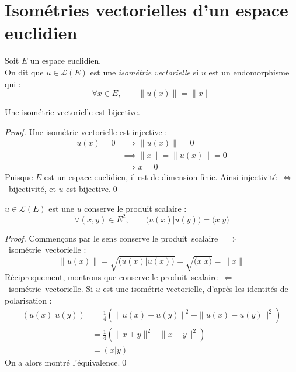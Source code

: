 \documentclass[11pt,a4paper,fleqn,pdftex]{report}
\begin{document}
\section{Isométries vectorielles d'un espace euclidien} %
\label{sec:isometries_vectorielles_d_un_espace_euclidien}
\begin{dfn}
     Soit $E$ un espace euclidien.\\
     On dit que $u\in \mathcal{L}(E)$ est une \emph{isométrie vectorielle} si $u$ est un endomorphisme qui  :
     \begin{equation}
     \forall x\in E,\qquad \|u(x)\| = \| x\|
     \end{equation}
\end{dfn}
\begin{theorem}[Bijectivité]
     Une isométrie vectorielle est bijective.
\end{theorem}
\begin{proof}
     Une isométrie vectorielle est injective : 
     \begin{align*}
         u(x) = 0 &\implies \| u(x)\| = 0\\ 
                  &\implies \| x \| = \| u(x)\| = 0\\ 
                  &\implies x=0
     \end{align*}
     Puisque $E$ est un espace euclidien, il est de dimension finie. Ainsi injectivité~$\Leftrightarrow$~bijectivité, et $u$ est bijective.\qed
\end{proof}
\begin{theorem}
     $u\in \mathcal{L}(E)$ est une  \ssi{} $u$ conserve le produit scalaire : 
     \begin{equation}
     \forall (x,y)\in E^2,\qquad \Big( u(x) \Big| u(y) \Big) = \big( x|y\big) 
     \end{equation}
\end{theorem}
\begin{proof}
     Commençons par le sens \og{}conserve le produit~scalaire~$\implies$~isométrie~vectorielle\fg{} : 
     \begin{equation*}
          \|u(x) \| = \sqrt{\big( u(x) | u(x) \big) }= \sqrt{\big( x | x \big) } = \| x \|
     \end{equation*}
     Réciproquement, montrons que \og{}conserve le produit~scalaire~$\Longleftarrow$~isométrie~vectorielle\fg{}.\newline
     Si $u$ est une isométrie vectorielle, d'après les identités de polarisation : 
     \begin{align*}
          \left( u(x) | u(y) \right) 
    &= \frac{1}{4} \left( \| u(x) + u(y) \|^2 - \| u(x) - u(y) \|^2 \right) \\
    &= \frac{1}{4} \left( \| x+y \|^2 - \| x-y \|^2 \right) \\ %
    &= (x|y)
     \end{align*}
     On a alors montré l'équivalence.\qed
\end{proof}
\end{document}
